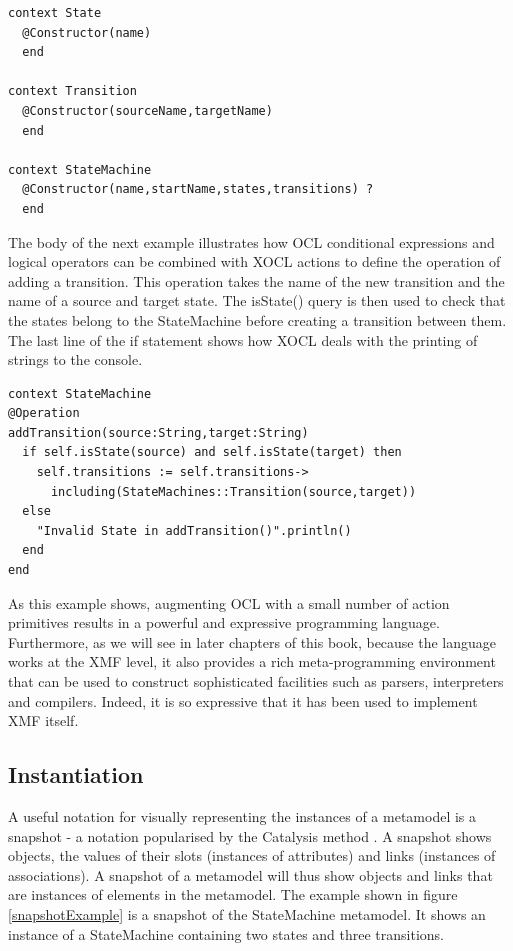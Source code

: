 \begin{lstlisting}
context State
  @Constructor(name)
  end

context Transition
  @Constructor(sourceName,targetName)
  end

context StateMachine
  @Constructor(name,startName,states,transitions) ?
  end
\end{lstlisting}
The body of the next example illustrates how OCL conditional
expressions and logical operators can be combined with XOCL
actions to define the operation of adding a transition. This
operation takes the name of the new transition and the name of a
source and target state. The isState() query is then used to check
that the states belong to the StateMachine before creating a
transition between them. The last line of the if statement shows
how XOCL deals with the printing of strings to the console.

\begin{lstlisting}
context StateMachine
@Operation
addTransition(source:String,target:String)
  if self.isState(source) and self.isState(target) then
    self.transitions := self.transitions->
      including(StateMachines::Transition(source,target))
  else
    "Invalid State in addTransition()".println()
  end
end
\end{lstlisting}As this example shows, augmenting OCL with a small number of
action primitives results in a powerful and expressive programming
language. Furthermore, as we will see in later chapters of this
book, because the language works at the XMF level, it also
provides a rich meta-programming environment that can be used to
construct sophisticated facilities such as parsers, interpreters
and compilers. Indeed, it is so expressive that it has been used
to implement XMF itself.

\subsection{Instantiation}

A useful notation for visually representing the instances of a
metamodel is a snapshot - a notation popularised by the Catalysis
method \cite{Catalysis}. A snapshot shows objects, the values of
their slots (instances of attributes) and links (instances of
associations). A snapshot of a metamodel will thus show objects
and links that are instances of elements in the metamodel. The
example shown in figure \ref{snapshotExample} is a snapshot of the
StateMachine metamodel. It shows an instance of a StateMachine
containing two states and three transitions.

